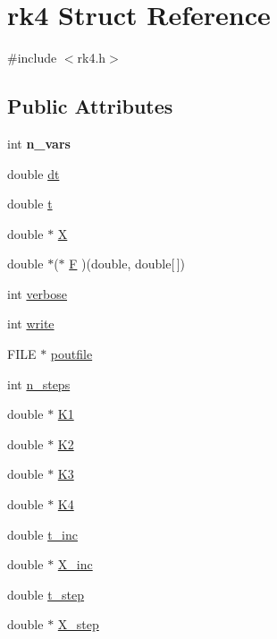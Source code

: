 \hypertarget{structrk4}{}\section{rk4 Struct Reference}
\label{structrk4}


{\ttfamily \#include $<$rk4.\+h$>$}

\subsection*{Public Attributes}
\begin{DoxyCompactItemize}
\item 
\hypertarget{structrk4_a1771335b8075b6c2bc2f7f365ece307b}{}int {\bfseries n\+\_\+vars}\label{structrk4_a1771335b8075b6c2bc2f7f365ece307b}

\item 
double \hyperlink{structrk4_a79622109dfc5eecf546f51828768d70e}{dt}
\item 
double \hyperlink{structrk4_ab1179e509c8df420d8d9f89af1a842d3}{t}
\item 
double $\ast$ \hyperlink{structrk4_acdd11c2d23e608d1a5b59b001c29e3fe}{X}
\item 
double $\ast$($\ast$ \hyperlink{structrk4_ad7511057d017bdbfb4749504a81a791c}{F} )(double, double\mbox{[}$\,$\mbox{]})
\item 
int \hyperlink{structrk4_af11a7c143fbea8168fb9d5d5c259e05e}{verbose}
\item 
int \hyperlink{structrk4_a23e792b89a89229f6d7a23190c98d9d8}{write}
\item 
F\+I\+L\+E $\ast$ \hyperlink{structrk4_ad2b4a48f52e1ea5206a306827ba717b7}{poutfile}
\item 
int \hyperlink{structrk4_afdb98234387428a832f96e7ccc2ec470}{n\+\_\+steps}
\item 
double $\ast$ \hyperlink{structrk4_ae34ed14cd80bff2057d6c608e8ee9073}{K1}
\item 
double $\ast$ \hyperlink{structrk4_a0a27f914e752daa876b07c31afa6babf}{K2}
\item 
double $\ast$ \hyperlink{structrk4_aa0a71aaaedac1ab7b3e03be4604e1845}{K3}
\item 
double $\ast$ \hyperlink{structrk4_af94017f53b4c629e055a14f8c48572dd}{K4}
\item 
double \hyperlink{structrk4_ab4c880c62f39a795976c2b0746accfa0}{t\+\_\+inc}
\item 
double $\ast$ \hyperlink{structrk4_add018b35c5fce3c60568f5f417247fba}{X\+\_\+inc}
\item 
double \hyperlink{structrk4_a1cd740ec71a9b29db5f7e66977e3f141}{t\+\_\+step}
\item 
double $\ast$ \hyperlink{structrk4_aad92411111f3087775236a631b4ede78}{X\+\_\+step}
\end{DoxyCompactItemize}


